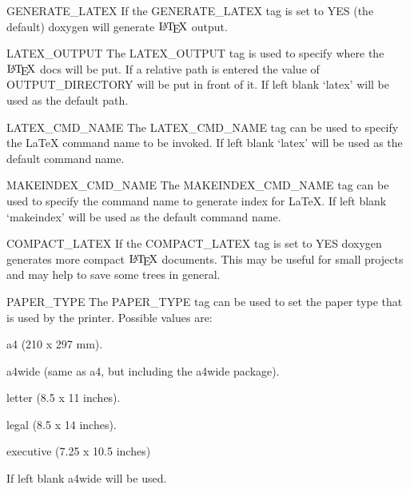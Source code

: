 \begin{DoxyDescription}
\item[{\ttfamily GENERATE\_\-LATEX} ] If the {\ttfamily GENERATE\_\-LATEX} tag is set to {\ttfamily YES} (the default) doxygen will generate $\mbox{\LaTeX}$ output.

\label{config_cfg_latex_output}
\hypertarget{config_cfg_latex_output}{}
 
\item[{\ttfamily LATEX\_\-OUTPUT} ] The {\ttfamily LATEX\_\-OUTPUT} tag is used to specify where the $\mbox{\LaTeX}$ docs will be put. If a relative path is entered the value of {\ttfamily OUTPUT\_\-DIRECTORY} will be put in front of it. If left blank `latex' will be used as the default path.

\label{config_cfg_latex_cmd_name}
\hypertarget{config_cfg_latex_cmd_name}{}
 
\item[{\ttfamily LATEX\_\-CMD\_\-NAME} ] The {\ttfamily LATEX\_\-CMD\_\-NAME} tag can be used to specify the LaTeX command name to be invoked. If left blank `latex' will be used as the default command name.

\label{config_cfg_makeindex_cmd_name}
\hypertarget{config_cfg_makeindex_cmd_name}{}
 
\item[{\ttfamily MAKEINDEX\_\-CMD\_\-NAME} ] The MAKEINDEX\_\-CMD\_\-NAME tag can be used to specify the command name to generate index for LaTeX. If left blank `makeindex' will be used as the default command name.

\label{config_cfg_compact_latex}
\hypertarget{config_cfg_compact_latex}{}
 
\item[{\ttfamily COMPACT\_\-LATEX} ] If the {\ttfamily COMPACT\_\-LATEX} tag is set to {\ttfamily YES} doxygen generates more compact $\mbox{\LaTeX}$ documents. This may be useful for small projects and may help to save some trees in general.

\label{config_cfg_paper_type}
\hypertarget{config_cfg_paper_type}{}
 
\item[{\ttfamily PAPER\_\-TYPE} ] The {\ttfamily PAPER\_\-TYPE} tag can be used to set the paper type that is used by the printer. Possible values are: 
\begin{DoxyItemize}
\item {\ttfamily a4} (210 x 297 mm). 
\item {\ttfamily a4wide} (same as a4, but including the a4wide package). 
\item {\ttfamily letter} (8.5 x 11 inches). 
\item {\ttfamily legal} (8.5 x 14 inches). 
\item {\ttfamily executive} (7.25 x 10.5 inches) 
\end{DoxyItemize}If left blank a4wide will be used.


\end{DoxyDescription}
